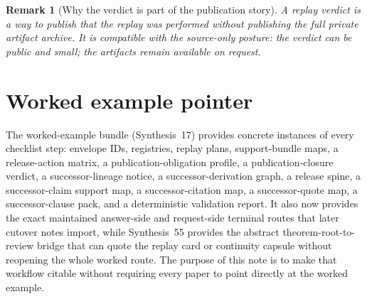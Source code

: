 \documentclass[11pt]{article}
\newtheorem{remark}{Remark}
\begin{document}
\begin{remark}[Why the verdict is part of the publication story]
A replay verdict is a way to publish \emph{that the replay was performed} without publishing the full private artifact archive.
It is compatible with the source-only posture: the verdict can be public and small; the artifacts remain available on request.
\end{remark}

\section{Worked example pointer}
The worked-example bundle (Synthesis~17) provides concrete instances of every checklist step: envelope IDs, registries, replay plans, support-bundle maps, a release-action matrix, a publication-obligation profile, a publication-closure verdict, a successor-lineage notice, a successor-derivation graph, a release spine, a successor-claim support map, a successor-citation map, a successor-quote map, a successor-clause pack, and a deterministic validation report.\cite{series:workedexample}
It also now provides the exact maintained answer-side and request-side terminal routes that later cutover notes import, while Synthesis~55 provides the abstract theorem-root-to-review bridge that can quote the replay card or continuity capsule without reopening the whole worked route.\cite{series:seriesspines}
The purpose of this note is to make that workflow citable without requiring every paper to point directly at the worked example.
\end{document}
